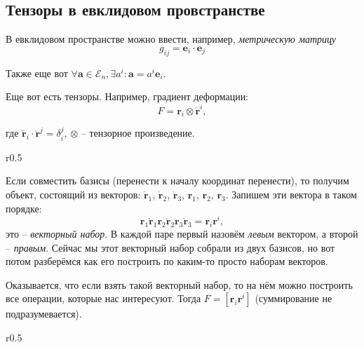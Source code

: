\subsection{Тензоры в евклидовом провстранстве}
В евклидовом пространстве можно ввести, например, \emph{метрическую
матрицу}
\[
  g_{ij} = \mathbf{e}_i \cdot \mathbf{e}_j
\]

Также еще вот $\forall \mathbf{a} \in \mathcal{E}_n, \exists a^i :  \mathbf{a} = a^i \mathbf{e}_i$.

Еще вот есть тензоры. Например, градиент деформации:
\[
  F = \mathbf{r}_i \otimes \mathring{\mathbf{r}}^i,
\]

\begin{figure}[H]
	\centering
	
\end{figure}
где $\mathring{\mathbf{r}}_i \cdot \mathring{\mathbf{r}}^j = \delta_i^j$,
  $\otimes$ -- тензорное произведение.
  

\begin{wrapfigure}{r}{0.5\textwidth}
	\centering
	
\end{wrapfigure}

Если совместить базисы (перенести к началу координат перенести), то получим объект, состоящий
из векторов: $\mathring{\mathbf{r}}_1$, $\mathring{\mathbf{r}}_2$, $\mathring{\mathbf{r}}_3$, $\mathbf{r}_1$,
$\mathbf{r}_2$, $\mathbf{r}_3$. Запишем эти вектора в таком порядке:
\[
  \mathbf{r}_1 \mathring{\mathbf{r}}_1 \mathbf{r}_2 \mathring{\mathbf{r}}_2 \mathbf{r}_3 \mathring{\mathbf{r}}_3 = \mathbf{r}_i \mathbf{r}^i,
\]
это -- \emph{векторный набор}. В каждой паре первый назовём \emph{левым} вектором, а
второй -- \emph{правым}. Сейчас мы этот векторный набор собрали из двух базисов, но вот потом
разберёмся как его построить по каким-то просто наборам векторов. 

%	

Оказывается, что если взять такой векторный набор, то на нём можно построить все операции, которые
нас интересуют. Тогда $F = [\mathbf{r}_i \mathbf{r}^i]$ (суммирование не подразумевается).

\begin{wrapfigure}{r}{0.5\textwidth}
	\centering
	
\end{wrapfigure}

